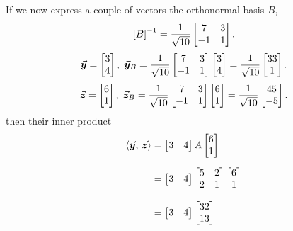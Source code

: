 \documentclass[../MathsNotesBase.tex]{subfiles}
\begin{document}
{\begin{exe}
{				If we now express a couple of vectors \wrt the orthonormal basis $B$,
				\[ {[B]}^{-1} = \frac{1}{\sqrt{10}} \begin{bmatrix}7 & 3 \\ -1 & 1\end{bmatrix}. \]
				\[ 
					\vec{\bm{y}} = \begin{bmatrix}3 \\ 4\end{bmatrix}, \; 
					\vec{\bm{y}}_B = \frac{1}{\sqrt{10}} \begin{bmatrix}7 & 3 \\ -1 & 1\end{bmatrix} \begin{bmatrix}3 \\ 4\end{bmatrix} = 
						\frac{1}{\sqrt{10}} \begin{bmatrix}33 \\ 1\end{bmatrix}. 
				\]
				\[ 
					\vec{\bm{z}} = \begin{bmatrix}6 \\ 1\end{bmatrix}, \; 
					\vec{\bm{z}}_B = \frac{1}{\sqrt{10}} \begin{bmatrix}7 & 3 \\ -1 & 1\end{bmatrix} \begin{bmatrix}6 \\ 1\end{bmatrix} = 
						\frac{1}{\sqrt{10}} \begin{bmatrix}45 \\ -5\end{bmatrix}. 
				\]
				then their inner product
				\[\begin{aligned}
					\inner{\y}{\z} &= \begin{bmatrix}3 & 4\end{bmatrix} A \begin{bmatrix}6 \\ 1\end{bmatrix} \nn
					&= \begin{bmatrix}3 & 4\end{bmatrix} \begin{bmatrix} 5 & 2\\ 2 & 1 \end{bmatrix} \begin{bmatrix}6 \\ 1\end{bmatrix} \nn
					&= \begin{bmatrix}3 & 4\end{bmatrix} \begin{bmatrix} 32 \\ 13 \end{bmatrix} \nn

\end{aligned}\]}
\end{exe}}
\end{document}
